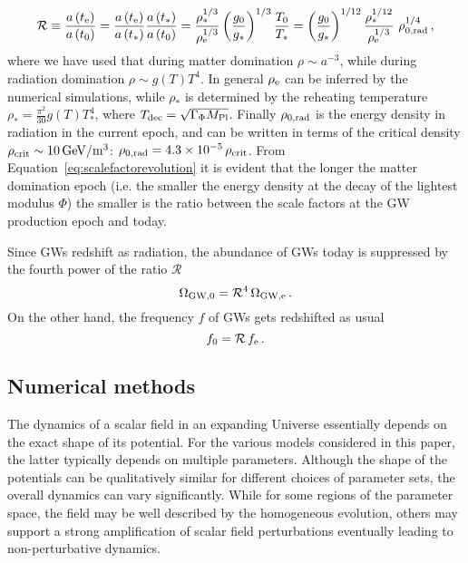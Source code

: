 \documentclass[12pt]{article}
\begin{document}
\begin{equation}
\label{eq:scalefactorevolution}
\mathcal{R} \equiv \frac{a\left(t_{\rm e}\right)}{a\left(t_{0}\right)} = \frac{a\left(t_{\rm e}\right)}{a\left(t_{*}\right)} \frac{a\left(t_{*}\right)}{a\left(t_{0}\right)} = \frac{\rho_{*}^{1/3}}{\rho_{\rm e}^{1/3}} \left(\frac{g_{ 0}}{g_{*}}\right)^{1/3} \frac{T_{0}}{T_{*}} = \left(\frac{g_{0}}{g_{*}}\right)^{1/12} \frac{\rho_{*}^{1/12}}{\rho_{\rm e}^{1/3}}~\rho_{0, \rm rad}^{1/4}\,,
\end{equation}
where we have used that during matter domination $\rho \sim a^{-3}$, while during radiation domination $\rho \sim g(T) T^4$. In general $\rho_{\rm e}$ can be inferred by the numerical simulations, while $\rho_{*}$ is determined by the reheating temperature $\rho_{*} = \frac{\pi^2}{30} g(T) T_{*}^4$, where $T_{\rm dec} = \sqrt{\Gamma_\Phi M_{\rm Pl}}$. Finally $\rho_{0, \rm rad}$ is the energy density in radiation in the current epoch, and can be written in terms of the critical density $\rho_{\rm crit} \sim 10 \,\rm GeV/m^3$: $\rho_{0, \rm rad} = 4.3 \times 10^{-5} \, \rho_{\rm crit}$. From Equation~\eqref{eq:scalefactorevolution} it is evident that the longer the matter domination epoch (i.e. the smaller the energy density at the decay of the lightest modulus $\Phi$) the smaller is the ratio between the scale factors at the GW production epoch and today.

Since GWs redshift as radiation, the abundance of GWs today is suppressed by the fourth power of the ratio $\mathcal{R}$
\begin{equation}
\Omega_{\rm GW, 0} = \mathcal{R}^4 \, \Omega_{\rm GW, e}\,.
\label{eq:rescaling1}
\end{equation}
On the other hand, the frequency $f$ of GWs gets redshifted as usual
\begin{equation}
f_0 = \mathcal{R} \, f_{\rm e}\,.
\label{eq:rescaling2}
\end{equation}


\subsection{Numerical methods}
\label{sec:numerical methods}
The dynamics of a scalar field in an expanding Universe essentially depends on the exact shape of its potential. For the various models considered in this paper, the latter typically depends on multiple parameters. Although the shape of the potentials can be qualitatively similar for different choices of parameter sets, the overall dynamics can vary significantly. While for some regions of the parameter space, the field may be well described by the homogeneous evolution, others may support a strong amplification of scalar field perturbations eventually leading to non-perturbative dynamics.
\end{document}

